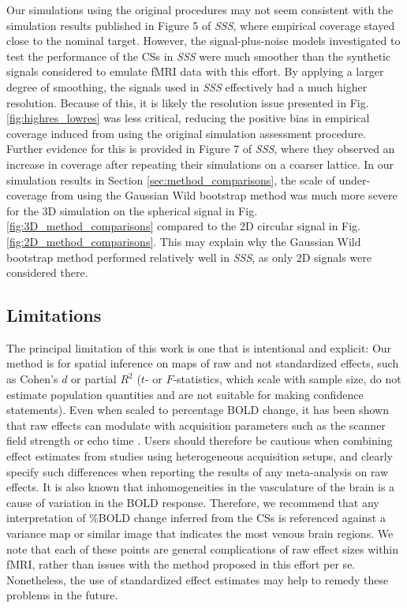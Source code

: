 Our simulations using the original procedures may not seem consistent with the simulation results published in Figure 5 of \textit{SSS}, where empirical coverage stayed close to the nominal target. However, the signal-plus-noise models investigated to test the performance of the CSs in \textit{SSS} were much smoother than the synthetic signals considered to emulate fMRI data with this effort. By applying a larger degree of smoothing, the signals used in \textit{SSS} effectively had a much higher resolution. Because of this, it is likely the resolution issue presented in Fig. \ref{fig:highres_lowres} was less critical, reducing the positive bias in empirical coverage induced from using the original simulation assessment procedure. Further evidence for this is provided in Figure 7 of \textit{SSS}, where they observed an increase in coverage after repeating their simulations on a coarser lattice. In our simulation results in Section \ref{sec:method_comparisons}, the scale of under-coverage from using the Gaussian Wild bootstrap method was much more severe for the 3D simulation on the spherical signal in Fig. \ref{fig:3D_method_comparisons} compared to the 2D circular signal in Fig. \ref{fig:2D_method_comparisons}. This may explain why the Gaussian Wild bootstrap method performed relatively well in \textit{SSS}, as only 2D signals were considered there. 

\subsection{Limitations}

The principal limitation of this work is one that is intentional and explicit: Our method is for spatial inference on maps of raw and not standardized effects, such as Cohen's $d$ or partial $R^{2}$ ($t$- or $F$-statistics, which scale with sample size, do not estimate population quantities and are not suitable for making  confidence statements). Even when scaled to percentage BOLD change, it has been shown that raw effects can modulate with acquisition parameters such as the scanner field strength or echo time \citep{UIudag2009-nm}. Users should therefore be cautious when combining effect estimates from studies using heterogeneous acquisition setups, and clearly specify such differences when reporting the results of any meta-analysis on raw effects. It is also known that inhomogeneities in the vasculature of the brain is a cause of variation in the BOLD response. Therefore, we recommend that any interpretation of \%BOLD change inferred from the CSs is referenced against a variance map or similar image that indicates the most venous brain regions. We note that each of these points are general complications of raw effect sizes within fMRI, rather than issues with the method proposed in this effort per se. Nonetheless, the use of standardized effect estimates may help to remedy these problems in the future.

